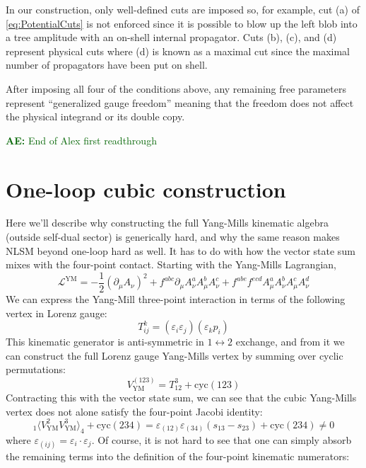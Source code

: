 \documentclass[11pt,letter]{article}
\newcommand{\ace}[1]{\textcolor{darkgreen}{\textbf{AE:}{ #1}}}
\def\be{\begin{equation}}
\begin{document}
In our construction, only well-defined cuts are imposed so, for
example, cut (a) of \cref{eq:PotentialCuts} is not enforced since it
is possible to blow up the left blob into a tree amplitude with an
on-shell internal propagator.  Cuts (b), (c), and (d) represent
physical cuts where (d) is known as a maximal cut since the maximal
number of propagators have been put on shell.  \fi

After imposing all four of the conditions above, any remaining free
parameters represent ``generalized gauge freedom'' meaning that the
freedom does not affect the physical integrand or its double copy.

\ace{End of Alex first readthrough}

\section{One-loop cubic construction}
\label{sec:cubic}
Here we'll describe why constructing the full Yang-Mills kinematic algebra (outside self-dual sector) is generically hard, and why the same reason makes NLSM beyond one-loop hard as well. It has to do with how the vector state sum mixes with the four-point contact. Starting with the Yang-Mills Lagrangian,
\begin{equation}
\mathcal{L}^{\text{YM}} = -\frac{1}{2}(\partial_\mu A_\nu)^2 + f^{abc} \partial_\mu A^a_\nu A^b_\mu A^c_\nu + f^{abe}f^{ecd}A^a_\mu A^b_\nu  A^c_\mu A^d_\nu 
\end{equation}
We can express the Yang-Mill three-point interaction in terms of the following vertex in Lorenz gauge:
\begin{equation}
T^k_{ij} = (\varepsilon_i\varepsilon_j)(\varepsilon_k p_i)
\end{equation}
This kinematic generator is anti-symmetric in $1\leftrightarrow 2$ exchange, and from it we can construct the full Lorenz gauge Yang-Mills vertex by summing over cyclic permutations:
\begin{equation}
V^{(123)}_{\text{YM}} = T^3_{12} +\text{cyc}(123)
\end{equation}
Contracting this with the vector state sum, we can see that the cubic Yang-Mills vertex does not alone satisfy the four-point Jacobi identity:
\be\label{cubicJac}
{}_1\langle V^{2}_{\text{YM}}V^{3}_{\text{YM}}\rangle_4+\text{cyc}(234) = \varepsilon_{(12)}  \varepsilon_{(34)} (s_{13}-s_{23}) +\text{cyc}(234) \neq 0
\end{equation}
where $ \varepsilon_{(ij)} =  \varepsilon_{i}\cdot  \varepsilon_{j}$. Of course, it is not hard to see that one can simply absorb the remaining terms into the definition of the four-point kinematic numerators:
\end{document}
